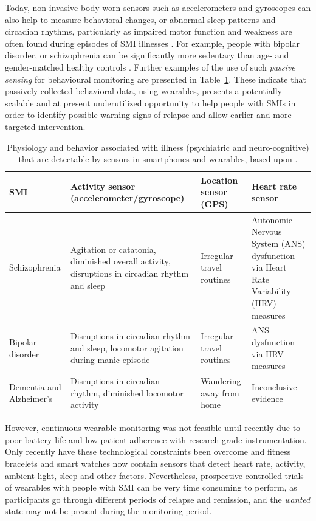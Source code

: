 \documentclass[letterpaper, 10pt, conference]{ieeeconf} %
\newcommand{\tab}[1]{Table~\ref{#1}}
\newcommand{\otoprule}{\midrule[\heavyrulewidth]}
\begin{document}
Today, non-invasive body-worn sensors such as accelerometers and gyroscopes can also help to measure behavioral changes, or abnormal sleep patterns and circadian rhythms, particularly as impaired motor function and weakness are often found during episodes of SMI illnesses \cite{SUrvey_2018}. For example, people with bipolar disorder, or schizophrenia can be significantly more sedentary than age- and gender-matched healthy controls \cite{van2017}. Further examples of the use of such \emph{passive sensing} for behavioural monitoring are presented in \tab{table:illness}. These indicate that passively collected behavioral data, using wearables, presents a potentially scalable and at present underutilized opportunity to help people with SMIs in order to identify possible warning signs of relapse and allow earlier and more targeted intervention. 
\begin{table}
  \centering
  \caption{Physiology and behavior associated with illness (psychiatric and neuro-cognitive) that are detectable by sensors in smartphones and wearables, based upon \cite{van2017, SUrvey_2018}.}
  \label{table:illness}
  \begin{tabularx}{\textwidth}{lXlX}
    \toprule
    SMI	& Activity sensor (accelerometer/gyroscope) & Location sensor (GPS)	& Heart rate sensor \\
    \otoprule
    Schizophrenia & Agitation or catatonia, diminished overall activity, disruptions in circadian rhythm and sleep &	Irregular travel routines & Autonomic Nervous System (ANS) dysfunction via  Heart Rate Variability (HRV) measures \\
    Bipolar disorder & Disruptions in circadian rhythm and sleep, locomotor agitation during manic episode & Irregular travel routines	& ANS dysfunction via  HRV measures \\
    Dementia and Alzheimer's & Disruptions in circadian rhythm, diminished locomotor activity &	Wandering away from home	& Inconclusive evidence \\
    \bottomrule
  \end{tabularx}
\end{table}

However, continuous wearable monitoring was not feasible until recently due to poor battery life and low patient adherence with research grade instrumentation. Only recently have these technological constraints been overcome and fitness bracelets and smart watches now contain sensors that detect heart rate, activity, ambient light, sleep and other factors. Nevertheless, prospective controlled trials of wearables with people with SMI can be very time consuming to perform, as participants go through different periods of relapse and remission, and the \emph{wanted} state may not be present during the monitoring period.
\end{document}
